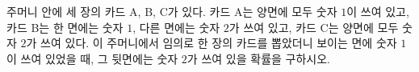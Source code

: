 주머니 안에 세 장의 카드 A, B, C가 있다. 카드 A는 양면에 모두 숫자 $1$이 쓰여 있고, 카드 B는 한 면에는 숫자 $1$, 다른 면에는 숫자 $2$가 쓰여 있고, 카드 C는 양면에 모두 숫자 $2$가 쓰여 있다. 이 주머니에서 임의로 한 장의 카드를 뽑았더니 보이는 면에 숫자 $1$이 쓰여 있었을 때, 그 뒷면에는 숫자 $2$가 쓰여 있을 확률을 구하시오.
